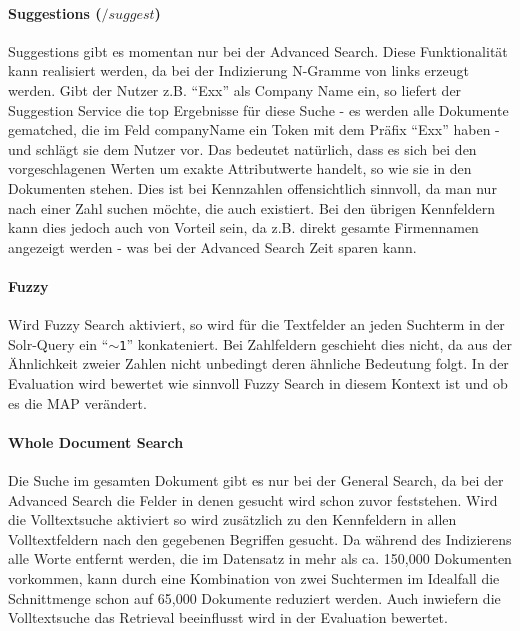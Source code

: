 \documentclass[oneside, a4paper, 12pt, titlepage]{article}
\begin{document}
\paragraph{Suggestions (\(/suggest\))} \label{Suggestions}
Suggestions gibt es momentan nur bei der Advanced Search. Diese Funktionalität kann realisiert werden, da bei der Indizierung N-Gramme von links erzeugt werden. Gibt der Nutzer z.B. ``Exx'' als Company Name ein, so liefert der Suggestion Service die top Ergebnisse für diese Suche - es werden alle Dokumente gematched, die im Feld companyName ein Token mit dem Präfix ``Exx'' haben - und schlägt sie dem Nutzer vor. Das bedeutet natürlich, dass es sich bei den vorgeschlagenen Werten um exakte Attributwerte handelt, so wie sie in den Dokumenten stehen. Dies ist bei Kennzahlen offensichtlich sinnvoll, da man nur nach einer Zahl suchen möchte, die auch existiert. Bei den übrigen Kennfeldern kann dies jedoch auch von Vorteil sein, da z.B. direkt gesamte Firmennamen angezeigt werden - was bei der Advanced Search Zeit sparen kann.

\paragraph{Fuzzy}
Wird Fuzzy Search aktiviert, so wird für die Textfelder an jeden Suchterm in der Solr-Query ein ``\texttt{$\sim$1}'' konkateniert. Bei Zahlfeldern geschieht dies nicht, da aus der Ähnlichkeit zweier Zahlen nicht unbedingt deren ähnliche Bedeutung folgt. In der Evaluation wird bewertet wie sinnvoll Fuzzy Search in diesem Kontext ist und ob es die MAP verändert.

\paragraph{Whole Document Search} \label{wds}
Die Suche im gesamten Dokument gibt es nur bei der General Search, da bei der Advanced Search die Felder in denen gesucht wird schon zuvor feststehen. Wird die Volltextsuche aktiviert so wird zusätzlich zu den Kennfeldern in allen Volltextfeldern nach den gegebenen Begriffen gesucht.
Da während des Indizierens alle Worte entfernt werden, die im Datensatz in mehr als ca. 150,000 Dokumenten vorkommen, kann durch eine Kombination von zwei Suchtermen im Idealfall die Schnittmenge schon auf 65,000 Dokumente reduziert werden.
Auch inwiefern die Volltextsuche das Retrieval beeinflusst wird in der Evaluation bewertet.

\label{logging}
\end{document}
